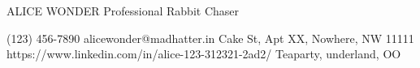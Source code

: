 \documentclass{resume}
\begin{document}
\begin{minipage}{0.55\linewidth}
\name
    {ALICE} {WONDER} %
    {Professional Rabbit Chaser} %
\color{black}
\end{minipage}%
\vspace{10pt}
\begin{minipage}{0.45\linewidth}
\contact
    {(123) 456-7890} %
    {alicewonder@madhatter.in} %
    {Cake St, Apt XX, Nowhere, NW 11111} %
    {https://www.linkedin.com/in/alice-123-312321-2ad2/} %
    {Teaparty, underland, OO} %
\end{minipage}%
\\
\noindent\makebox[\linewidth]{\rule{590pt}{1.0pt}} \vspace{5pt}
\vspace{10pt}
\end{document}
